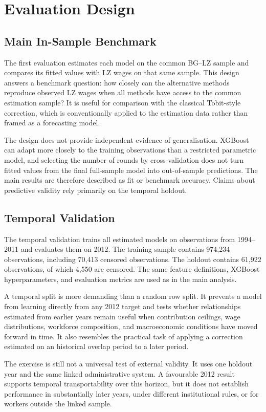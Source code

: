 \documentclass[12pt,a4paper,oneside,titlepage]{book}
\begin{document}
\chapter{Evaluation Design}
\label{ch:evaluation}

\section{Main In-Sample Benchmark}
The first evaluation estimates each model on the common BG--LZ sample and compares its fitted values with LZ wages on that same sample. This design answers a benchmark question: how closely can the alternative methods reproduce observed LZ wages when all methods have access to the common estimation sample? It is useful for comparison with the classical Tobit-style correction, which is conventionally applied to the estimation data rather than framed as a forecasting model.

The design does not provide independent evidence of generalisation. XGBoost can adapt more closely to the training observations than a restricted parametric model, and selecting the number of rounds by cross-validation does not turn fitted values from the final full-sample model into out-of-sample predictions. The main results are therefore described as fit or benchmark accuracy. Claims about predictive validity rely primarily on the temporal holdout.

\section{Temporal Validation}
The temporal validation trains all estimated models on observations from 1994--2011 and evaluates them on 2012. The training sample contains 974,234 observations, including 70,413 censored observations. The holdout contains 61,922 observations, of which 4,550 are censored. The same feature definitions, XGBoost hyperparameters, and evaluation metrics are used as in the main analysis.

A temporal split is more demanding than a random row split. It prevents a model from learning directly from any 2012 target and tests whether relationships estimated from earlier years remain useful when contribution ceilings, wage distributions, workforce composition, and macroeconomic conditions have moved forward in time. It also resembles the practical task of applying a correction estimated on an historical overlap period to a later period.

The exercise is still not a universal test of external validity. It uses one holdout year and the same linked administrative system. A favourable 2012 result supports temporal transportability over this horizon, but it does not establish performance in substantially later years, under different institutional rules, or for workers outside the linked sample.
\end{document}

